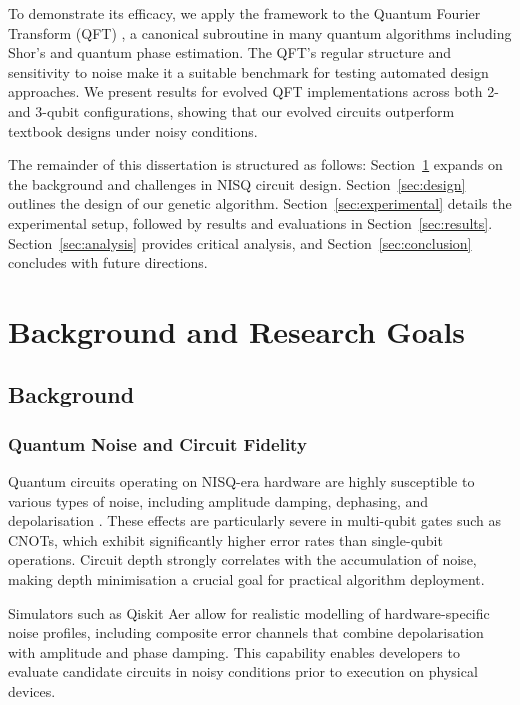 \documentclass[11pt,a4paper]{article}
\begin{document}
To demonstrate its efficacy, we apply the framework to the Quantum Fourier Transform (QFT) \cite{Jozsa1997QuantumAA}, a canonical subroutine in many quantum algorithms including Shor’s and quantum phase estimation. The QFT’s regular structure and sensitivity to noise make it a suitable benchmark for testing automated design approaches. We present results for evolved QFT implementations across both 2- and 3-qubit configurations, showing that our evolved circuits outperform textbook designs under noisy conditions.\newline

The remainder of this dissertation is structured as follows: Section~\ref{sec:background} expands on the background and challenges in NISQ circuit design. Section~\ref{sec:design} outlines the design of our genetic algorithm. Section~\ref{sec:experimental} details the experimental setup, followed by results and evaluations in Section~\ref{sec:results}. Section~\ref{sec:analysis} provides critical analysis, and Section~\ref{sec:conclusion} concludes with future directions.

%
%
\section{Background and Research Goals} \label{sec:background}
\subsection{Background}
\subsubsection*{Quantum Noise and Circuit Fidelity}
Quantum circuits operating on NISQ-era hardware are highly susceptible to various types of noise, including amplitude damping, dephasing, and depolarisation \cite{Clerk2008IntroductionTQ}. These effects are particularly severe in multi-qubit gates such as CNOTs, which exhibit significantly higher error rates than single-qubit operations. Circuit depth strongly correlates with the accumulation of noise, making depth minimisation a crucial goal for practical algorithm deployment.\newline

Simulators such as Qiskit Aer allow for realistic modelling of hardware-specific noise profiles, including composite error channels that combine depolarisation with amplitude and phase damping. This capability enables developers to evaluate candidate circuits in noisy conditions prior to execution on physical devices.
\end{document}
